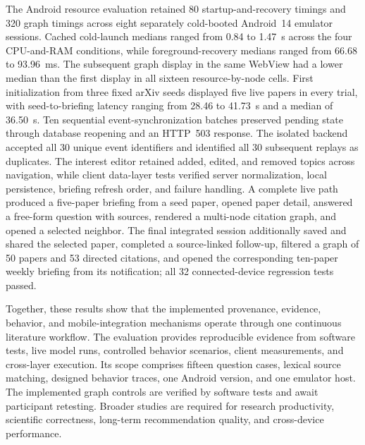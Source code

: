 \begin{digest}
The Android resource evaluation retained 80 startup-and-recovery timings and 320 graph timings across eight separately cold-booted Android~14 emulator sessions. Cached cold-launch medians ranged from 0.84 to 1.47~s across the four CPU-and-RAM conditions, while foreground-recovery medians ranged from 66.68 to 93.96~ms. The subsequent graph display in the same WebView had a lower median than the first display in all sixteen resource-by-node cells. First initialization from three fixed arXiv seeds displayed five live papers in every trial, with seed-to-briefing latency ranging from 28.46 to 41.73~s and a median of 36.50~s. Ten sequential event-synchronization batches preserved pending state through database reopening and an HTTP~503 response. The isolated backend accepted all 30 unique event identifiers and identified all 30 subsequent replays as duplicates. The interest editor retained added, edited, and removed topics across navigation, while client data-layer tests verified server normalization, local persistence, briefing refresh order, and failure handling. A complete live path produced a five-paper briefing from a seed paper, opened paper detail, answered a free-form question with sources, rendered a multi-node citation graph, and opened a selected neighbor. The final integrated session additionally saved and shared the selected paper, completed a source-linked follow-up, filtered a graph of 50 papers and 53 directed citations, and opened the corresponding ten-paper weekly briefing from its notification; all 32 connected-device regression tests passed.

Together, these results show that the implemented provenance, evidence, behavior, and mobile-integration mechanisms operate through one continuous literature workflow. The evaluation provides reproducible evidence from software tests, live model runs, controlled behavior scenarios, client measurements, and cross-layer execution. Its scope comprises fifteen question cases, lexical source matching, designed behavior traces, one Android version, and one emulator host. The implemented graph controls are verified by software tests and await participant retesting. Broader studies are required for research productivity, scientific correctness, long-term recommendation quality, and cross-device performance.

\end{digest}
